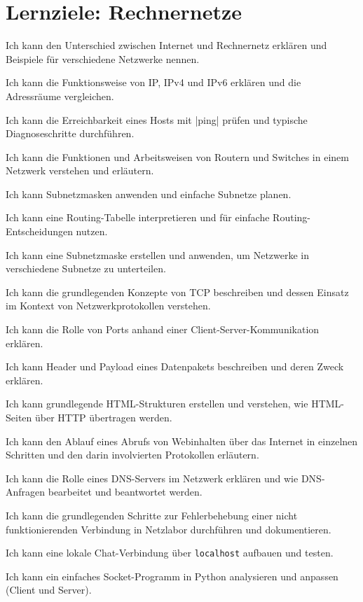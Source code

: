 \chapter{Lernziele: Rechnernetze}
\begin{todolist}
\item Ich kann den Unterschied zwischen Internet und Rechnernetz erklären und Beispiele für verschiedene Netzwerke nennen.
\item Ich kann die Funktionsweise von \gls{IP}, \gls{IP}v4 und \gls{IP}v6 erklären und die Adressräume vergleichen.
\item Ich kann die Erreichbarkeit eines Hosts mit \commandbox*|ping| prüfen und typische Diagnoseschritte durchführen.
\item Ich kann die Funktionen und Arbeitsweisen von Routern und Switches in einem Netzwerk verstehen und erläutern.
\item Ich kann Subnetzmasken anwenden und einfache Subnetze planen.
\item Ich kann eine Routing-Tabelle interpretieren und für einfache Routing-Entscheidungen nutzen.
\item Ich kann eine Subnetzmaske erstellen und anwenden, um Netzwerke in verschiedene Subnetze zu unterteilen.
\item Ich kann die grundlegenden Konzepte von \gls{TCP} beschreiben und dessen Einsatz im Kontext von Netzwerkprotokollen verstehen.
\item Ich kann die Rolle von Ports anhand einer Client-Server-Kommunikation erklären.
\item Ich kann Header und Payload eines Datenpakets beschreiben und deren Zweck erklären.
\item Ich kann grundlegende \gls{HTML}-Strukturen erstellen und verstehen, wie \gls{HTML}-Seiten über \gls{HTTP} übertragen werden.
\item Ich kann den Ablauf eines Abrufs von Webinhalten über das Internet in einzelnen Schritten und den darin involvierten Protokollen erläutern.
\item Ich kann die Rolle eines \gls{DNS}-Servers im Netzwerk erklären und wie \gls{DNS}-Anfragen bearbeitet und beantwortet werden.
\item Ich kann die grundlegenden Schritte zur Fehlerbehebung einer nicht funktionierenden Verbindung in Netzlabor durchführen und dokumentieren.
\item Ich kann eine lokale Chat-Verbindung über \texttt{localhost} aufbauen und testen.
\item Ich kann ein einfaches Socket-Programm in Python analysieren und anpassen (Client und Server).

\end{todolist}

